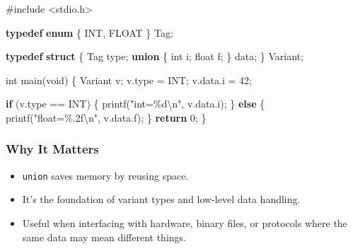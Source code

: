 \documentclass[
  letterpaper,
  DIV=11,
  numbers=noendperiod]{scrreprt}
\newenvironment{Shaded}{\begin{snugshade}}{\end{snugshade}}
\newcommand{\ControlFlowTok}[1]{\textcolor[rgb]{0.00,0.23,0.31}{\textbf{#1}}}
\newcommand{\DataTypeTok}[1]{\textcolor[rgb]{0.68,0.00,0.00}{#1}}
\newcommand{\DecValTok}[1]{\textcolor[rgb]{0.68,0.00,0.00}{#1}}
\newcommand{\ImportTok}[1]{\textcolor[rgb]{0.00,0.46,0.62}{#1}}
\newcommand{\KeywordTok}[1]{\textcolor[rgb]{0.00,0.23,0.31}{\textbf{#1}}}
\newcommand{\NormalTok}[1]{\textcolor[rgb]{0.00,0.23,0.31}{#1}}
\newcommand{\OperatorTok}[1]{\textcolor[rgb]{0.37,0.37,0.37}{#1}}
\newcommand{\PreprocessorTok}[1]{\textcolor[rgb]{0.68,0.00,0.00}{#1}}
\newcommand{\SpecialCharTok}[1]{\textcolor[rgb]{0.37,0.37,0.37}{#1}}
\newcommand{\StringTok}[1]{\textcolor[rgb]{0.13,0.47,0.30}{#1}}
\providecommand{\tightlist}{%
  \setlength{\itemsep}{0pt}\setlength{\parskip}{0pt}}
\begin{document}
\begin{Shaded}
\begin{Highlighting}[]
\PreprocessorTok{\#include }\ImportTok{\textless{}stdio.h\textgreater{}}

\KeywordTok{typedef} \KeywordTok{enum} \OperatorTok{\{}\NormalTok{ INT}\OperatorTok{,}\NormalTok{ FLOAT }\OperatorTok{\}}\NormalTok{ Tag}\OperatorTok{;}

\KeywordTok{typedef} \KeywordTok{struct} \OperatorTok{\{}
\NormalTok{    Tag type}\OperatorTok{;}
    \KeywordTok{union} \OperatorTok{\{}
        \DataTypeTok{int}\NormalTok{ i}\OperatorTok{;}
        \DataTypeTok{float}\NormalTok{ f}\OperatorTok{;}
    \OperatorTok{\}}\NormalTok{ data}\OperatorTok{;}
\OperatorTok{\}}\NormalTok{ Variant}\OperatorTok{;}

\DataTypeTok{int}\NormalTok{ main}\OperatorTok{(}\DataTypeTok{void}\OperatorTok{)} \OperatorTok{\{}
\NormalTok{    Variant v}\OperatorTok{;}
\NormalTok{    v}\OperatorTok{.}\NormalTok{type }\OperatorTok{=}\NormalTok{ INT}\OperatorTok{;}
\NormalTok{    v}\OperatorTok{.}\NormalTok{data}\OperatorTok{.}\NormalTok{i }\OperatorTok{=} \DecValTok{42}\OperatorTok{;}

    \ControlFlowTok{if} \OperatorTok{(}\NormalTok{v}\OperatorTok{.}\NormalTok{type }\OperatorTok{==}\NormalTok{ INT}\OperatorTok{)} \OperatorTok{\{}
\NormalTok{        printf}\OperatorTok{(}\StringTok{"int=}\SpecialCharTok{\%d\textbackslash{}n}\StringTok{"}\OperatorTok{,}\NormalTok{ v}\OperatorTok{.}\NormalTok{data}\OperatorTok{.}\NormalTok{i}\OperatorTok{);}
    \OperatorTok{\}} \ControlFlowTok{else} \OperatorTok{\{}
\NormalTok{        printf}\OperatorTok{(}\StringTok{"float=}\SpecialCharTok{\%.2f\textbackslash{}n}\StringTok{"}\OperatorTok{,}\NormalTok{ v}\OperatorTok{.}\NormalTok{data}\OperatorTok{.}\NormalTok{f}\OperatorTok{);}
    \OperatorTok{\}}
    \ControlFlowTok{return} \DecValTok{0}\OperatorTok{;}
\OperatorTok{\}}
\end{Highlighting}
\end{Shaded}

\subsubsection{Why It Matters}\label{why-it-matters-37}

\begin{itemize}
\tightlist
\item
  \texttt{union} saves memory by reusing space.
\item
  It's the foundation of variant types and low-level data handling.
\item
  Useful when interfacing with hardware, binary files, or protocols
  where the same data may mean different things.
\end{itemize}
\end{document}
